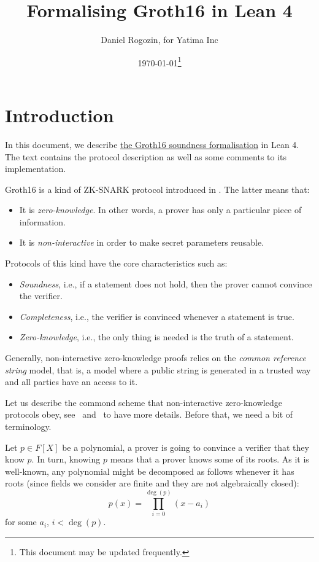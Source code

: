 \documentclass{article}
\title{Formalising Groth16 in Lean 4}
\author{Daniel Rogozin, for Yatima Inc}
\date{\today\footnote{This document may be updated frequently.}}
\theoremstyle{definition}
\theoremstyle{remark}
\begin{document}
\maketitle

\section{Introduction}

In this document, we describe \href{https://github.com/yatima-inc/ZKSnark.lean/blob/main/ZkSNARK/Groth16/KnowledgeSoundness.lean}{the Groth16 soundness formalisation} in Lean 4.
The text contains the protocol description as well as some comments to its implementation.

Groth16 is a kind of ZK-SNARK protocol introduced in \cite{groth2016size}. The latter means that:

\begin{itemize}
\item It is \emph{zero-knowledge}. In other words, a prover has only a particular piece of information.
\item It is \emph{non-interactive} in order to make secret parameters reusable.
\end{itemize}

Protocols of this kind have the core characteristics such as:
\begin{itemize}
\item \emph{Soundness}, i.e., if a statement does not hold, then the prover cannot convince the verifier.
\item \emph{Completeness}, i.e., the verifier is convinced whenever a statement is true.
\item \emph{Zero-knowledge}, i.e., the only thing is needed is the truth of a statement.
\end{itemize}

Generally, non-interactive zero-knowledge proofs relies on the \emph{common reference string} model, that is, a model where a public string is generated in a trusted way and all parties have an access to it.

Let us describe the commond scheme that non-interactive zero-knowledge protocols obey, see~\cite{petkus2019and} and~\cite{bitansky2012extractable} to have more details. Before that, we need a bit of terminology.

Let $p \in F[X]$ be a polynomial, a prover is going to convince a verifier that they know $p$. In turn, knowing $p$ means that a prover knows some of its roots. As it is well-known, any polynomial might be decomposed as follows whenever it has roots (since fields we consider are finite and they are not algebraically closed):
\begin{equation}
p(x) = \prod_{i = 0}^{\deg(p)} (x - a_i)
\end{equation}
for some $a_i$, $i < \deg(p)$.
\end{document}

